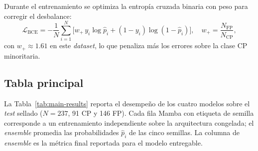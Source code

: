 \documentclass[11pt,a4paper]{article}
\begin{document}
Durante el entrenamiento se optimiza la entropía cruzada binaria con
peso para corregir el desbalance:
\begin{equation}
\mathcal{L}_{\text{BCE}} = -\frac{1}{N}\sum_{i=1}^{N}
  \bigl[ w_+ \, y_i \log \hat{p}_i + (1-y_i) \log(1-\hat{p}_i) \bigr],
\quad w_+ = \frac{N_{\text{FP}}}{N_{\text{CP}}},
\end{equation}
con $w_+ \approx 1.61$ en este \textit{dataset}, lo que penaliza más
los errores sobre la clase CP minoritaria.

\subsection{Tabla principal}
\label{subsec:main-results}

La Tabla~\ref{tab:main-results} reporta el desempeño de los cuatro
modelos sobre el \textit{test} sellado ($N = 237$, 91 CP y 146 FP).
Cada fila Mamba con etiqueta de semilla corresponde a un
entrenamiento independiente sobre la arquitectura congelada; el
\textit{ensemble} promedia las probabilidades $\hat{p}_i$ de las
cinco semillas. La columna de \textit{ensemble} es la métrica final
reportada para el modelo entregable.
\end{document}
